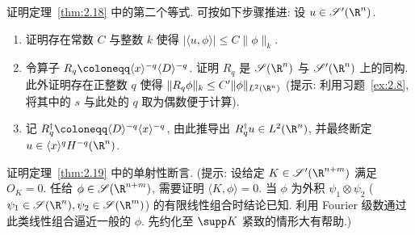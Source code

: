 \begin{exer}\label{ex:2.16}
证明定理~\ref{thm:2.18} 中的第二个等式. 可按如下步骤推进: 设 $u \in \TempDistr(\R^n)$.
\begin{enumerate}
    \item 证明存在常数 $C$ 与整数 $k$ 使得 $|\langle u, \phi \rangle| \le C \|\phi\|_k$.
    \item 令算子 $R_q \defeq \langle x \rangle^{-q} \langle D \rangle^{-q}$. 证明 $R_q$ 是 $\Schwartz(\R^n)$ 与 $\TempDistr(\R^n)$ 上的同构. 此外证明存在正整数 $q$ 使得 $\|R_q \phi\|_k \le C' \|\phi\|_{L^2(\R^n)}$ (提示: 利用习题~\ref{ex:2.8}, 将其中的 $s$ 与此处的 $q$ 取为偶数便于计算).
    \item 记 $R_q^\dag \defeq \langle D \rangle^{-q} \langle x \rangle^{-q}$, 由此推导出 $R_q^\dag u \in L^2(\R^n)$, 并最终断定 $u \in \langle x \rangle^q H^{-q}(\R^n)$.
\end{enumerate}
\end{exer}

\begin{exer}\label{ex:2.17}
证明定理~\ref{thm:2.19} 中的单射性断言. (提示: 设给定 $K \in \TempDistr(\R^{n+m})$ 满足 $O_K = 0$. 任给 $\phi \in \Schwartz(\R^{n+m})$, 需要证明 $\langle K, \phi \rangle = 0$. 当 $\phi$ 为外积 $\psi_1 \otimes \psi_2$ ($\psi_1 \in \Schwartz(\R^n), \psi_2 \in \Schwartz(\R^m)$) 的有限线性组合时结论已知. 利用 Fourier 级数通过此类线性组合逼近一般的 $\phi$. 先约化至 $\supp K$ 紧致的情形大有帮助.)
\end{exer}

